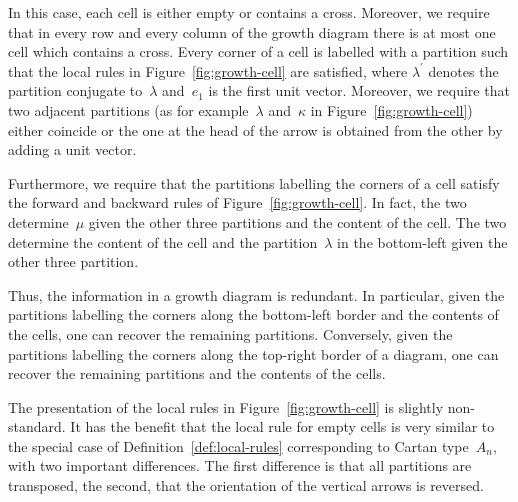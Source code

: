 In this case, each cell is either empty or contains a cross.
Moreover, we require that in every row and every column of the growth
diagram there is at most one cell which contains a cross. Every
corner of a cell is labelled with a partition such that the local
rules in Figure~\ref{fig:growth-cell} are satisfied, where
$\lambda^\prime$ denotes the partition conjugate to~$\lambda$
and~$e_1$ is the first unit vector. Moreover, we require that two
adjacent partitions (as for example~$\lambda$ and~$\kappa$ in
Figure~\ref{fig:growth-cell}) either coincide or the one at the head
of the arrow is obtained from the other by adding a unit vector.

Furthermore, we require that the partitions labelling the corners of
a cell satisfy the forward and backward rules of
Figure~\ref{fig:growth-cell}. In fact, the two 
determine~$\mu$ given the other three partitions and the content of
the cell. The two  determine the content of the
cell and the partition~$\lambda$ in the bottom-left given the other
three partition.

Thus, the information in a growth diagram is redundant. In
particular, given the partitions labelling the corners along the
bottom-left border and the contents of the cells, one can recover the
remaining partitions. Conversely, given the partitions labelling the
corners along the top-right border of a diagram, one can recover the
remaining partitions and the contents of the cells.

The presentation of the local rules in Figure~\ref{fig:growth-cell}
is slightly non-standard. It has the benefit that the local rule for
empty cells is very similar to the special case of
Definition~\ref{def:local-rules} corresponding to Cartan type~$A_n$,
with two important differences. The first difference is that all
partitions are transposed, the second, that the orientation of the
vertical arrows is reversed.

